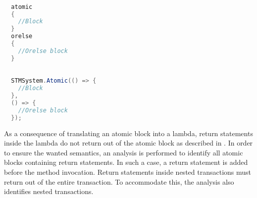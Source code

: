 \begin{lstlisting}[label=lst:before_atomic_block,
  caption={\bscode{atomic} Block Before Transformation},
  language=Java,  
  showspaces=false,
  showtabs=false,
  breaklines=true,
  showstringspaces=false,
  breakatwhitespace=true,
  commentstyle=\color{greencomments},
  keywordstyle=\color{bluekeywords},
  stringstyle=\color{redstrings},
  morekeywords={atomic, retry, orelse, var, get, set}]  % Start your code-block

  atomic
  {
    //Block
  }
  orelse
  {
    //Orelse block
  }
\end{lstlisting}

\begin{lstlisting}[label=lst:after_atomic_block,
  caption={\bscode{atomic} Block After Transformation},
  language=Java,  
  showspaces=false,
  showtabs=false,
  breaklines=true,
  showstringspaces=false,
  breakatwhitespace=true,
  commentstyle=\color{greencomments},
  keywordstyle=\color{bluekeywords},
  stringstyle=\color{redstrings},
  morekeywords={atomic, retry, orelse, var, get, set}]  % Start your code-block

  STMSystem.Atomic(() => {
    //Block					
  },
  () => {
    //Orelse block
  });
\end{lstlisting}

As a consequence of translating an atomic block into a lambda, return statements inside the lambda do not return out of the atomic block as described in . In order to ensure the wanted semantics, an analysis is performed to identify all atomic blocks containing return statements. In such a case, a return statement is added before the method invocation. Return statements inside nested transactions must return out of the entire transaction. To accommodate this, the analysis also identifies nested transactions.

